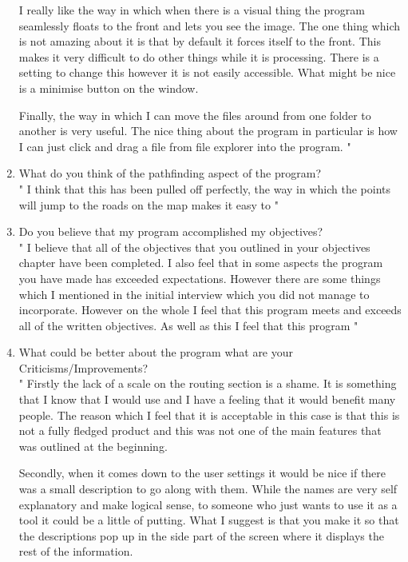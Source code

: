 \begin{FlushLeft}
\begin{enumerate}
        I really like the way in which when there is a visual thing the program seamlessly floats to the front and lets you see the image. The one thing which is not amazing about it is that by default it forces itself to the front. This makes it very difficult to do other things while it is processing. There is a setting to change this however it is not easily accessible. What might be nice is a minimise button on the window. \\ \bk

        Finally, the way in which I can move the files around from one folder to another is very useful. The nice thing about the program in particular is how I can just click and drag a file from file explorer into the program.
        " \\ \BK


        \item What do you think of the pathfinding aspect of the program? \\\bk
        "
        I think that this has been pulled off perfectly, the way in which the points will jump to the roads on the map makes it easy to 
        " \\ \BK
    
        \item Do you believe that my program accomplished my objectives? \\\bk
        "
        I believe that all of the objectives that you outlined in your objectives chapter have been completed. I also feel that in some aspects the program you have made has exceeded expectations. However there are some things which I mentioned in the initial interview which you did not manage to incorporate. However on the whole I feel that this program meets and exceeds all of the written objectives. As well as this I feel that this program
        " \\ \BK

        \item What could be better about the program what are your Criticisms/Improvements? \\\bk
        "
        Firstly the lack of a scale on the routing section is a shame. It is something that I know that I would use and I have a feeling that it would benefit many people. The reason which I feel that it is acceptable in this case is that this is not a fully fledged product and this was not one of the main features that was outlined at the beginning. \\ \bk

        Secondly, when it comes down to the user settings it would be nice if there was a small description to go along with them. While the names are very self explanatory and make logical sense, to someone who just wants to use it as a tool it could be a little of putting. What I suggest is that you make it so that the descriptions pop up in the side part of the screen where it displays the rest of the information.  \\ \bk


\end{enumerate}
\end{FlushLeft}
